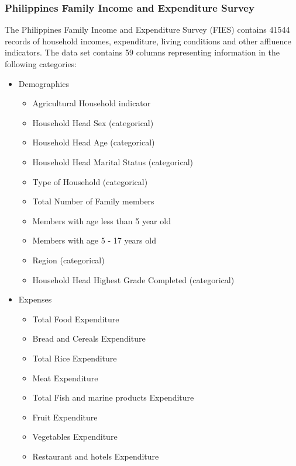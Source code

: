 \documentclass{article}
\begin{document}
\subsubsection{Philippines Family Income and Expenditure Survey}
The Philippines Family Income and Expenditure Survey (FIES) contains 41544 records of household incomes, expenditure, living conditions and other affluence indicators. The data set contains 59 columns representing information in the following categories:

\begin{itemize}
  \item Demographics
    \begin{multicols}{2}
      \begin{itemize}
        \item Agricultural Household indicator
        \item Household Head Sex (categorical)
        \item Household Head Age (categorical)
        \item Household Head Marital Status (categorical)
        \item Type of Household (categorical)
        \item Total Number of Family members
        \item Members with age less than 5 year old
        \item Members with age 5 - 17 years old
        \item Region (categorical)
        \item Household Head Highest Grade Completed (categorical)
      \end{itemize}
    \end{multicols}
  \item Expenses
    \begin{multicols}{2}
      \begin{itemize}
        \item Total Food Expenditure
        \item Bread and Cereals Expenditure
        \item Total Rice Expenditure
        \item Meat Expenditure
        \item Total Fish and marine products Expenditure
        \item Fruit Expenditure
        \item Vegetables Expenditure
        \item Restaurant and hotels Expenditure

\end{itemize}
\end{multicols}
\end{itemize}
\end{document}
